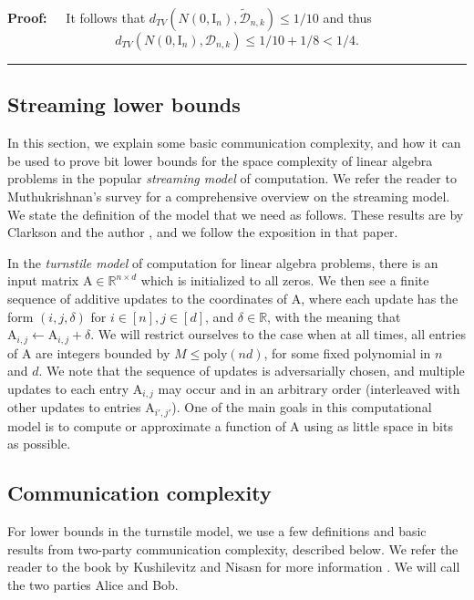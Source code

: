 \documentclass[11pt]{article}
\newenvironment{proof}{\begin{trivlist} \item {\bf Proof:~~}}
  {\qed\end{trivlist}}
\newcommand{\mat}[1]{{\ensuremath{\bm{\mathrm{#1}}}}}
\def\matA{\mat{A}}
\def\matI{\mat{I}}
\def\qed{\hfill\rule{2mm}{2mm}}
\newcommand{\poly}{{\mathrm{poly}}}
\begin{document}
\begin{proof}
It follows that $d_{TV}(N(0,\matI_{n}),\widetilde{\mathcal{D}}_{n,k})\leq 1/10$ and thus 
\[
d_{TV}(N(0,\matI_{n}),\mathcal{D}_{n,k})\leq 1/10+1/8 < 1/4.
\]
\end{proof}

\subsection{Streaming lower bounds}\label{sec:streaming}
In this section, we explain some basic communication complexity,
and how it can be used to prove bit lower bounds for the space
complexity of linear algebra problems in the popular {\it streaming model} of computation.
We refer the reader to Muthukrishnan's survey \cite{m05} for a comprehensive overview on the streaming
model. We state the definition of the model that we need as follows. These results are by Clarkson
and the author \cite{CW09}, and we follow the exposition in that paper.

In the {\it turnstile model} of computation for linear algebra problems, there is an input matrix
$\matA \in \mathbb{R}^{n \times d}$ which is initialized to all zeros. We then see a finite sequence of 
additive updates to the coordinates of $\matA$, where each update has the form $(i,j,\delta)$
for $i \in [n], j \in [d]$, and $\delta \in \mathbb{R}$, with the meaning that 
$\matA_{i,j} \leftarrow \matA_{i,j} + \delta$. We will restrict ourselves to the case when at all
times, all entries of $\matA$ are integers bounded by $M \leq \poly(nd)$, for some fixed polynomial
in $n$ and $d$. We note that the sequence of updates is adversarially chosen, and multiple
updates to each entry $\matA_{i,j}$ may occur and in an arbitrary order (interleaved with other
updates to entries $\matA_{i', j'}$). One of the main goals in this computational model is to
compute or approximate a function of $\matA$ using as little space in bits as possible. 

\subsection{Communication complexity}
For lower bounds in the turnstile model, we use a few definitions and basic results
from two-party communication complexity, described below. We refer the reader to the
book by Kushilevitz and Nisasn for more information \cite{kn97}.
We will call the two parties Alice and Bob.
\end{document}
